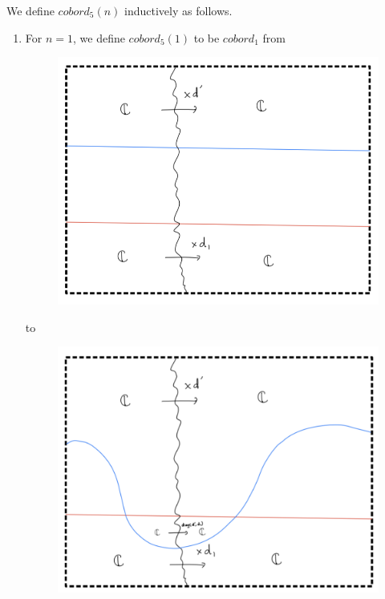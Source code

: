 We define $cobord_5(n)$ inductively as follows.
\begin{enumerate}[label = (\roman*)]
\item For $n=1$, we define $cobord_5(1)$ to be $cobord_1$ from
\begin{figure}[H]
    \centering
    \includegraphics[scale = 0.8]{diagrams/cobord5/2.png} 
    \caption{}
    \label{fig:your-label}
\end{figure}
to
\begin{figure}[H]
    \centering
    \includegraphics[scale = 0.6]{diagrams/cobord5/3.png} 
    \caption{}
    \label{fig:your-label}
\end{figure}


\end{enumerate}
